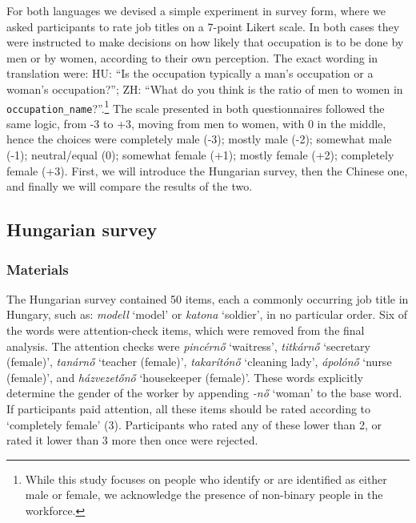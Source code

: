 \documentclass[11pt]{article}
\begin{document}
For both languages we devised a simple experiment in survey form, where we asked participants to rate job titles on a 7-point Likert scale. In both cases they were instructed to make decisions on how likely that occupation is to be done by men or by women, according to their own perception. The exact wording in translation were: HU: ``Is the occupation typically a man's occupation or a woman's occupation?''; ZH: ``What do you think is the ratio of men to women in \texttt{occupation\_name}?''.\footnote{While this study focuses on people who identify or are identified as either male or female, we acknowledge the presence of non-binary people in the workforce.} The scale presented in both questionnaires followed the same logic, from -3 to +3, moving from men to women, with 0 in the middle, hence the choices were completely male (-3); mostly male (-2); somewhat male (-1); neutral/equal (0); somewhat female (+1); mostly female (+2); completely female (+3). First, we will introduce the Hungarian survey, then the Chinese one, and finally we will compare the results of the two.

\subsection{Hungarian survey}


\subsubsection{Materials}

The Hungarian survey contained 50 items, each a commonly occurring job title in Hungary, such as: \textit{modell} `model' or \textit{katona} `soldier', in no particular order. Six of the words were attention-check items, which were removed from the final analysis. The attention checks were \textit{pincérnő} `waitress', \textit{titkárnő} `secretary (female)', \textit{tanárnő} `teacher (female)', \textit{takarítónő} `cleaning lady', \textit{ápolónő} `nurse (female)', and \textit{házvezetőnő} `housekeeper (female)'. These words explicitly determine the gender of the worker by appending \textit{-nő} `woman' to the base word. If participants paid attention, all these items should be rated according to `completely female' (3). Participants who rated any of these lower than 2, or rated it lower than 3 more then once were rejected. 
\end{document}
